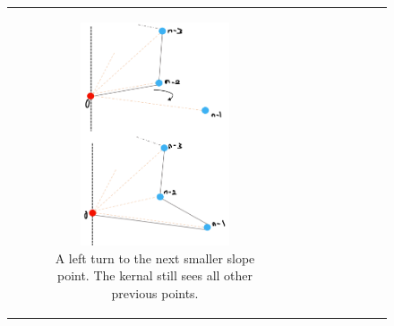 \documentclass [12pt]{article}
\begin{document}
\begin{enumerate}[label=(\alph*)]
        \begin{figure}[h] 
            \begin{tabular}{cc} 
                \begin{subfigure}{0.5\textwidth}
                    \centering
                    \includegraphics[width=0.7\textwidth]{images/stara.PNG}
                    \caption{A left turn to the next smaller slope point. The kernal still sees all other previous points.}
                    \label{fig:stara}
                \end{subfigure} &
                \begin{subfigure}{0.5\textwidth}
                    \centering

\end{subfigure}
\end{tabular}
\end{figure}
\end{enumerate}
\end{document}
